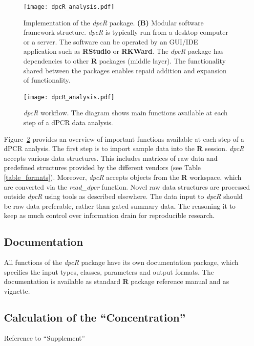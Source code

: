 \documentclass[a4,center,fleqn]{NAR}
\begin{document}
\begin{figure}[t]
\begin{center}
\texttt{[image: dpcR\_analysis.pdf]}
\end{center}
\caption{Implementation of the \textit{dpcR} package. \textbf{(B)} Modular software 
framework structure. \textit{dpcR} is typically run from a desktop computer or a 
server. The software can be operated by an GUI/IDE application such as 
\textbf{RStudio} or \textbf{RKWard}. The \textit{dpcR} package has dependencies 
to other \textbf{R} packages (middle layer). The functionality shared between 
the packages enables repaid addition and expansion of functionality.}
\label{dpcR_framework}
\end{figure}

\begin{figure}[t]
\begin{center}
\texttt{[image: dpcR\_analysis.pdf]}
\end{center}
\caption{\textit{dpcR} workflow. The diagram shows main functions 
available at each step of a dPCR data analysis.}
\label{workflow}
\end{figure}

Figure~\ref{workflow} provides an overview of important functions available at 
each step of a dPCR analysis. The first step is to import sample data into the 
\textbf{R} session. \textit{dpcR} accepts various data structures. This includes 
matrices of raw data and predefined structures provided by the different vendors 
(see Table \ref{table_formats}). Moreover, \textit{dpcR} accepts objects from 
the \textbf{R} workspace, which are converted via the \textit{read\_dpcr} 
function. Novel raw data structures are processed outside \textit{dpcR} using 
tools as described elsewhere. The data input to \textit{dpcR} should be raw data 
preferable, rather than gated summary data. The reasoning it to keep as much 
control over information drain for reproducible research.

\subsection{Documentation}

All functions of the \textit{dpcR} package have its own documentation package, 
which specifies the input types, classes, parameters and output formats. The 
documentation is available as standard \textbf{R} package reference manual and 
as vignette.

\subsection{Calculation of the ``Concentration''}
Reference to ``Supplement''
\end{document}
